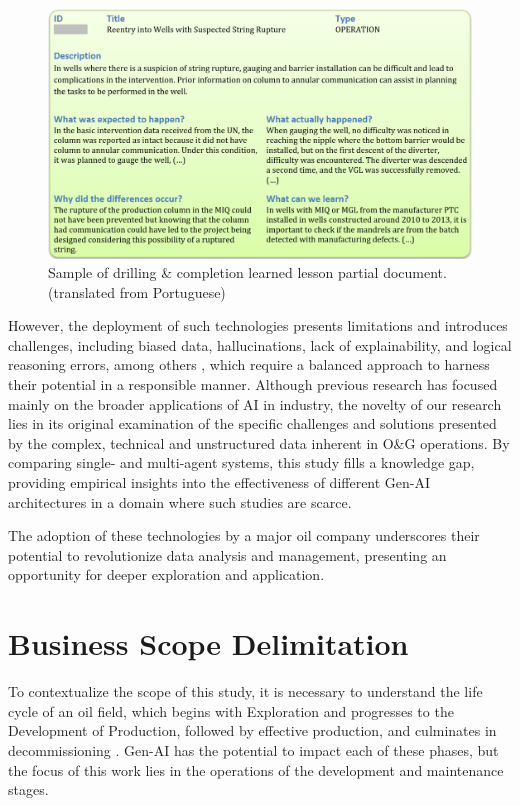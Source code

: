     \begin{figure}[t]
        \centering
        \includegraphics[width=1\textwidth]{images/report_example.png}
        \caption{Sample of drilling \& completion learned lesson partial document. (translated from Portuguese)}
        \label{fig:report_example}
    \end{figure}           
    
    However, the deployment of such technologies presents limitations and introduces challenges, including biased data, hallucinations, lack of explainability, and logical reasoning errors, among others \citep{Hadi2023}, which require a balanced approach to harness their potential in a responsible manner.    
    Although previous research has focused mainly on the broader applications of AI in industry, the novelty of our research lies in its original examination of the specific challenges and solutions presented by the complex, technical and unstructured data inherent in O\&G operations. 
    By comparing single- and multi-agent systems, this study fills a knowledge gap, providing empirical insights into the effectiveness of different Gen-AI architectures in a domain where such studies are scarce. 
    
    The adoption of these technologies by a major oil company underscores their potential to revolutionize data analysis and management, presenting an opportunity for deeper exploration and application.

\section{Business Scope Delimitation}

    To contextualize the scope of this study, it is necessary to understand the life cycle of an oil field, which begins with Exploration and progresses to the Development of Production, followed by effective production, and culminates in decommissioning \citep{Badiru2016}. Gen-AI has the potential to impact each of these phases, but the focus of this work lies in the operations of the development and maintenance stages.
            

